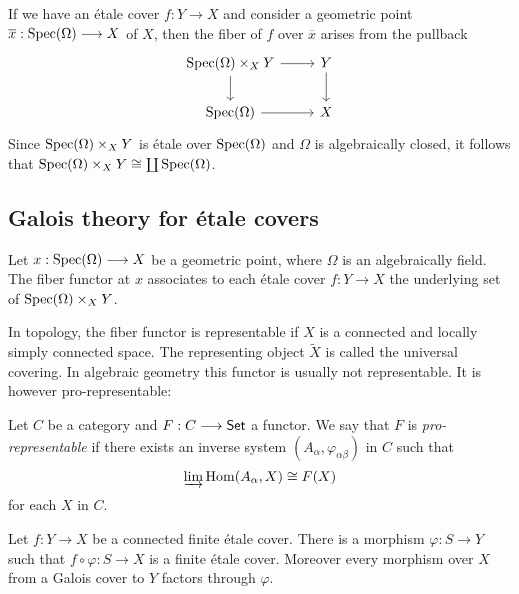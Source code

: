 \begin{remark}
  If we have an \'etale cover $f: Y \to X$ and consider a geometric point $\overline{x} : \operatorname{Spec}(\Omega) \longrightarrow X$ of $X$, then the fiber of $f$ over $\overline{x}$ arises from the pullback
    \[\begin{tikzcd}
    	{\Spec(\Omega)\times_X Y} & Y \\
    	{\Spec(\Omega)} & X
    	\arrow[from=1-1, to=2-1]
    	\arrow[from=1-1, to=1-2]
    	\arrow[from=1-2, to=2-2]
    	\arrow[from=2-1, to=2-2]
    \end{tikzcd}\]
  Since $\operatorname{Spec}(\Omega)\times_X Y$ is \'etale over $\operatorname{Spec}(\Omega)$ and $\Omega$ is algebraically closed, it follows that $\operatorname{Spec}(\Omega)\times_X Y \cong \coprod \operatorname{Spec}(\Omega)$.
\end{remark}

\subsection{Galois theory for \'etale covers}
\begin{definition}
  Let $x: \operatorname{Spec}(\Omega) \longrightarrow X$ be a geometric point, where $\Omega$ is an algebraically field. The fiber functor at $x$ associates to each \'etale cover $f: Y \to X$ the underlying set of $\operatorname{Spec}(\Omega) \times_X Y$.
\end{definition}

\begin{remark}
  In topology, the fiber functor is representable if $X$ is a connected and locally simply connected space. The representing object $\tilde{X}$ is called the universal covering. In algebraic geometry this functor is usually not representable. It is however pro-representable:
\end{remark}

\begin{definition}
  Let $C$ be a category and $F: C \longrightarrow \mathsf{Set}$ a functor. We say that $F$ is \textit{pro-representable} if there exists an \Gls{inverse system} $(A_\alpha,\varphi_{\alpha \beta})$ in $C$ such that 
  \[
    \varinjlim \operatorname{Hom}(A_\alpha, X) \cong F(X)
    \]
  for each $X$ in $C$.
\end{definition}
\begin{lemma}
  Let $f: Y \to X$ be a connected finite \'etale cover. There is a morphism $\varphi: S \to Y$ such that $f \circ \varphi: S \to X$ is a finite \'etale cover. Moreover every morphism over $X$ from a Galois cover to $Y$ factors through $\varphi$.
\end{lemma}

